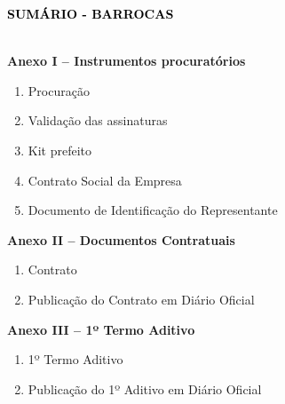\documentclass[
]{article}
\author{}
\date{}
\newcommand{\TituloSumarioFonte}{\sffamily\bfseries\Large}
\newcommand{\TituloSumarioCor}{black}
\begin{document}
{\TituloSumarioFonte\textcolor{\TituloSumarioCor}{SUMÁRIO - BARROCAS}}\\

\strut \\

\textbf{Anexo I -- Instrumentos procuratórios }
\begin{enumerate}
    \item Procuração 
        \item Validação das assinaturas 
    \item Kit prefeito 
    \item Contrato Social da Empresa 
    \item Documento de Identificação do Representante 
\end{enumerate}

\textbf{Anexo II -- Documentos Contratuais }
\begin{enumerate}
    \item Contrato 
        \item Publicação do Contrato em Diário Oficial 
\end{enumerate}

\textbf{Anexo III -- 1º Termo Aditivo }
\begin{enumerate}
    \item 1º Termo Aditivo 
    \item Publicação do 1º Aditivo em Diário Oficial 
\end{enumerate}
\end{document}
